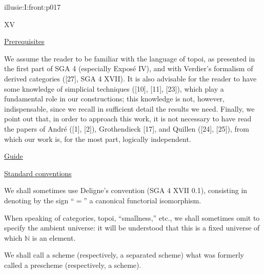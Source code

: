 \IllusieSetPhysicalPageSize{450.6bp}{704bp}
\begin{illusiefrontpage}{illusie:I:front:p017}{}
\begin{center}\fontsize{10}{12}\selectfont XV\end{center}
\vspace{8bp}
\hypertarget{illusie:I:prereq}{}%
\underline{Prerequisites}

\vspace{6bp}
\hypertarget{illusie:I:prereq:p1}{}%
\hspace*{22bp}We assume the reader to be familiar with the language of topoi, as
presented in the first part of SGA 4 (especially Exposé IV), and with Verdier's
formalism of derived categories ([27], SGA 4 XVII). It is also advisable for the
reader to have some knowledge of simplicial techniques ([10], [11], [23]), which
play a fundamental role in our constructions; this knowledge is not, however,
indispensable, since we recall in sufficient detail the results we need. Finally,
we point out that, in order to approach this work, it is not necessary to have
read the papers of André ([1], [2]), Grothendieck [17], and Quillen ([24], [25]),
from which our work is, for the most part, logically independent.

\vspace{8bp}
\hypertarget{illusie:I:prereq:guide}{}%
\underline{Guide}

\vspace{2bp}
\hypertarget{illusie:I:prereq:guide:d1}{}%
\begin{center}\IllusieChapterGuide\end{center}

\vspace{2bp}
\hypertarget{illusie:I:conv}{}%
\underline{Standard conventions}

\vspace{6bp}
\hypertarget{illusie:I:conv:p1}{}%
\hspace*{22bp}We shall sometimes use Deligne's convention (SGA 4 XVII 0.1), consisting
in denoting by the sign ``$=$'' a canonical functorial isomorphism.

\vspace{4bp}
\hypertarget{illusie:I:conv:p2}{}%
\hspace*{22bp}When speaking of categories, topoi, ``smallness,'' etc., we shall
sometimes omit to specify the ambient universe: it will be understood that this
is a fixed universe of which $\mathbb{N}$ is an element.

\vspace{4bp}
\hypertarget{illusie:I:conv:p3}{}%
\hspace*{22bp}We shall call a scheme (respectively, a separated scheme) what was
formerly called a prescheme (respectively, a scheme).
\end{illusiefrontpage}
